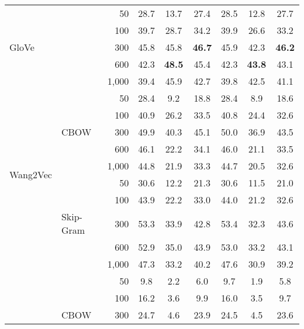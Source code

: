 \begin{table}[t]
{\begin{tabular}{llrccc|ccc}
        &  & 50 & 28.7 & 13.7 & 27.4 & 28.5 & 12.8 & 27.7\\
         & & 100 & 39.7 & 28.7 & 34.2 & 39.9 & 26.6 & 33.2\\
        GloVe & & 300 & 45.8 & 45.8 & \textbf{46.7} & 45.9 & 42.3 & \textbf{46.2}\\
        & & 600 & 42.3 & \textbf{48.5} & 45.4 & 42.3 & \textbf{43.8} & 43.1\\
        & & 1,000 & 39.4 & 45.9 & 42.7 & 39.8 & 42.5 & 41.1\\
        \midrule
		 & & 50 & 28.4 & 9.2 & 18.8 & 28.4 & 8.9 & 18.6\\
        &  & 100 & 40.9 & 26.2 & 33.5 & 40.8 & 24.4 & 32.6\\
         & CBOW & 300 & 49.9 & 40.3 & 45.1 & 50.0 & 36.9 & 43.5\\
        & & 600 & 46.1 & 22.2 & 34.1 & 46.0 & 21.1 & 33.5\\
        \multirow{2}{*}{Wang2Vec} & & 1,000 & 44.8 & 21.9 & 33.3 & 44.7 & 20.5 & 32.6\\
        \cmidrule{2-9}
        &  & 50 & 30.6 & 12.2 & 21.3 & 30.6 & 11.5 & 21.0\\
        &  & 100 & 43.9 & 22.2 & 33.0 & 44.0 & 21.2 & 32.6 \\
        & Skip-Gram& 300 & 53.3 & 33.9 &  42.8 & 53.4 & 32.3 & 43.6\\
        & & 600 & 52.9 & 35.0 & 43.9 & 53.0 & 33.2 & 43.1\\
        & & 1,000 & 47.3 & 33.2 & 40.2 & 47.6 & 30.9 & 39.2\\
        \midrule
        & & 50 & 9.8 & 2.2 & 6.0 & 9.7 & 1.9 & 5.8\\
        & & 100 & 16.2 & 3.6 & 9.9 & 16.0 & 3.5 & 9.7\\
        & CBOW & 300 & 24.7 & 4.6 & 23.9 & 24.5 & 4.5 & 23.6\\

\end{tabular}}
\end{table}

